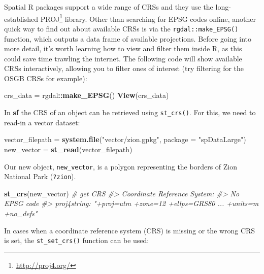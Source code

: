 \documentclass[]{krantz}
\newenvironment{Shaded}{\begin{snugshade}}{\end{snugshade}}
\newcommand{\CommentTok}[1]{\textcolor[rgb]{0.37,0.37,0.37}{\textit{#1}}}
\newcommand{\DataTypeTok}[1]{\textcolor[rgb]{0.27,0.27,0.27}{#1}}
\newcommand{\KeywordTok}[1]{\textcolor[rgb]{0.27,0.27,0.27}{\textbf{#1}}}
\newcommand{\NormalTok}[1]{#1}
\newcommand{\OperatorTok}[1]{\textcolor[rgb]{0.43,0.43,0.43}{\textbf{#1}}}
\newcommand{\StringTok}[1]{\textcolor[rgb]{0.5,0.5,0.5}{#1}}
\let\rmarkdownfootnote\footnote%
\def\footnote{\protect\rmarkdownfootnote}
\renewcommand{\href}[2]{#2\footnote{\url{#1}}}
\begin{document}
Spatial R packages support a wide range of CRSs and they use the long-established \href{http://proj4.org/}{PROJ} library.
Other than searching for EPSG codes online, another quick way to find out about available CRSs is via the \texttt{rgdal::make\_EPSG()} function, which outputs a data frame of available projections.
Before going into more detail, it's worth learning how to view and filter them inside R, as this could save time trawling the internet.
The following code will show available CRSs interactively, allowing you to filter ones of interest (try filtering for the OSGB CRSs for example):

\begin{Shaded}
\begin{Highlighting}[]
\NormalTok{crs_data =}\StringTok{ }\NormalTok{rgdal}\OperatorTok{::}\KeywordTok{make_EPSG}\NormalTok{()}
\KeywordTok{View}\NormalTok{(crs_data)}
\end{Highlighting}
\end{Shaded}

In \textbf{sf} the CRS of an object can be retrieved using \texttt{st\_crs()}.
For this, we need to read-in a vector dataset:

\begin{Shaded}
\begin{Highlighting}[]
\NormalTok{vector_filepath =}\StringTok{ }\KeywordTok{system.file}\NormalTok{(}\StringTok{"vector/zion.gpkg"}\NormalTok{, }\DataTypeTok{package =} \StringTok{"spDataLarge"}\NormalTok{)}
\NormalTok{new_vector =}\StringTok{ }\KeywordTok{st_read}\NormalTok{(vector_filepath)}
\end{Highlighting}
\end{Shaded}

Our new object, \texttt{new\_vector}, is a polygon representing the borders of Zion National Park (\texttt{?zion}).

\begin{Shaded}
\begin{Highlighting}[]
\KeywordTok{st_crs}\NormalTok{(new_vector) }\CommentTok{# get CRS}
\CommentTok{#> Coordinate Reference System:}
\CommentTok{#> No EPSG code}
\CommentTok{#> proj4string: "+proj=utm +zone=12 +ellps=GRS80 ... +units=m +no_defs"}
\end{Highlighting}
\end{Shaded}

In cases when a coordinate reference system (CRS) is missing or the wrong CRS is set, the \texttt{st\_set\_crs()} function can be used:
\end{document}
